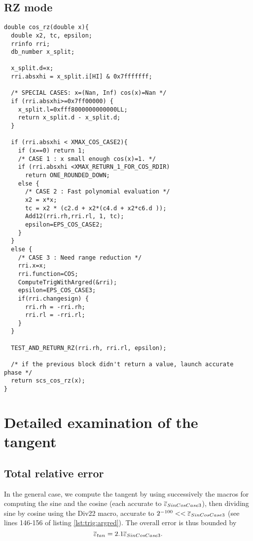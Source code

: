 \subsection{RZ mode}
\begin{lstlisting}[caption={Exceptional cases for cosine RZ},firstnumber=1]
double cos_rz(double x){ 
  double x2, tc, epsilon; 
  rrinfo rri;
  db_number x_split;

  x_split.d=x;
  rri.absxhi = x_split.i[HI] & 0x7fffffff;

  /* SPECIAL CASES: x=(Nan, Inf) cos(x)=Nan */
  if (rri.absxhi>=0x7ff00000) {
    x_split.l=0xfff8000000000000LL;
    return x_split.d - x_split.d;
  }   

  if (rri.absxhi < XMAX_COS_CASE2){
    if (x==0) return 1;
    /* CASE 1 : x small enough cos(x)=1. */
    if (rri.absxhi <XMAX_RETURN_1_FOR_COS_RDIR)
      return ONE_ROUNDED_DOWN; 
    else {
      /* CASE 2 : Fast polynomial evaluation */
      x2 = x*x;
      tc = x2 * (c2.d + x2*(c4.d + x2*c6.d ));
      Add12(rri.rh,rri.rl, 1, tc);
      epsilon=EPS_COS_CASE2; 
    }
  }
  else {
    /* CASE 3 : Need range reduction */ 
    rri.x=x;
    rri.function=COS;
    ComputeTrigWithArgred(&rri);
    epsilon=EPS_COS_CASE3;
    if(rri.changesign) {
      rri.rh = -rri.rh;
      rri.rl = -rri.rl;
    } 
  }

  TEST_AND_RETURN_RZ(rri.rh, rri.rl, epsilon);

  /* if the previous block didn't return a value, launch accurate phase */
  return scs_cos_rz(x);
}
\end{lstlisting}

\section{Detailed examination of the tangent}

\subsection{Total relative error}
In the general case, we compute the tangent by using successively the
macros for computing the sine and the cosine (each accurate to
${\overline{\varepsilon}}_{SinCosCase3}$), then dividing sine by cosine using the Div22
macro, accurate to $2^{-100}<<{\overline{\varepsilon}}_{SinCosCase3}$ (see lines 146-156
of listing \ref{lst:trig:argred}). The overall error is thus bounded
by $${\overline{\varepsilon}}_{tan} = 2.1{\overline{\varepsilon}}_{SinCosCase3} .$$


